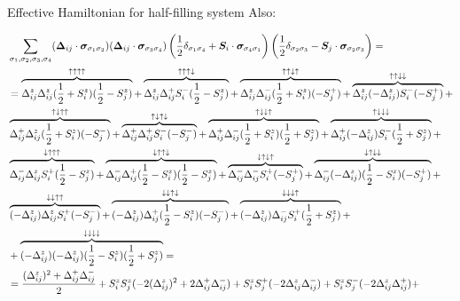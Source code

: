 \begin{section}{Effective Hamiltonian for half-filling system}
Also:

\begin{align*}
&\sum_{\sigma_1, \sigma_2, \sigma_3, \sigma_4} (\bs{\Delta}_{ij}\cdot\bs{\sigma}_{\sigma_1 \sigma_2})(\bs{\Delta}_{ij} \cdot\bs{\sigma}_{\sigma_3 \sigma_4})\left(\frac{1}{2}\delta_{\sigma_1 \sigma_4} + \bs{S}_i\cdot\bs{\sigma}_{\sigma_4 \sigma_1}\right)\left(\frac{1}{2}\delta_{\sigma_2 \sigma_3}-\bs{S}_j\cdot\bs{\sigma}_{\sigma_2 \sigma_3}\right) = \\
&= \overbrace{\Delta_{ij}^z\Delta_{ij}^z(\frac{1}{2}+S_i^z)(\frac{1}{2}-S_j^z)}^{\uparrow \uparrow \uparrow \uparrow} +
	\overbrace{\Delta_{ij}^z\Delta_{ij}^+S_i^-(\frac{1}{2}-S_j^z)}^{\uparrow \uparrow \uparrow \downarrow} +
	\overbrace{\Delta_{ij}^z\Delta_{ij}^-(\frac{1}{2}+ S_i^z)(-S_j^+)}^{\uparrow \uparrow \downarrow \uparrow} +
	\overbrace{\Delta_{ij}^z(-\Delta_{ij}^z) S_i^-(-S_j^+)}^{\uparrow \uparrow \downarrow \downarrow} + \\
	&\overbrace{\Delta_{ij}^+\Delta_{ij}^z (\frac{1}{2}+S_i^z)(-S_j^-)}^{\uparrow \downarrow \uparrow \uparrow} +
	\overbrace{\Delta_{ij}^+\Delta_{ij}^+S_i^-(-S_j^-)}^{\uparrow \downarrow \uparrow \downarrow} +
	\overbrace{\Delta_{ij}^+\Delta_{ij}^-(\frac{1}{2}+S_i^z)(\frac{1}{2}+S_j^z)}^{\uparrow \downarrow \downarrow \uparrow} +
	\overbrace{\Delta_{ij}^+(-\Delta_{ij}^z) S_i^-(\frac{1}{2}+S_j^z)}^{\uparrow \downarrow \downarrow \downarrow} + \\
	&\overbrace{\Delta_{ij}^-\Delta_{ij}^z S_i^+(\frac{1}{2}-S_j^z)}^{\downarrow \uparrow \uparrow \uparrow} +
	\overbrace{\Delta_{ij}^-\Delta_{ij}^+(\frac{1}{2}-S_i^z)(\frac{1}{2}-S_j^z)}^{\downarrow \uparrow \uparrow \downarrow} +
	\overbrace{\Delta_{ij}^-\Delta_{ij}^-S_i^+(-S_j^+)}^{\downarrow \uparrow \downarrow \uparrow} +
	\overbrace{\Delta_{ij}^-(-\Delta_{ij}^z) (\frac{1}{2} - S_i^z) (-S_j^+)}^{\downarrow \uparrow \downarrow \downarrow} + \\
	& \overbrace{(-\Delta_{ij}^z)\Delta_{ij}^z S_i^+(-S_j^-)}^{\downarrow \downarrow \uparrow \uparrow} +
	\overbrace{(-\Delta_{ij}^z)\Delta_{ij}^+ (\frac{1}{2}-S_i^z)(-S_j^-)}^{\downarrow \downarrow \uparrow \downarrow} +
	\overbrace{(-\Delta_{ij}^z)\Delta_{ij}^- S_i^+(\frac{1}{2}+S_j^z)}^{\downarrow \downarrow \downarrow \uparrow} + \\
	&+\overbrace{(-\Delta_{ij}^z)(-\Delta_{ij}^z)(\frac{1}{2}-S_i^z)(\frac{1}{2}+S_j^z)}^{\downarrow \downarrow \downarrow \downarrow} = \\
&= \frac{(\Delta_{ij}^z)^2+\Delta_{ij}^+\Delta_{ij}^-}{2} + S_i^zS_j^z (-2(\Delta_{ij}^z)^2 + 2\Delta_{ij}^+\Delta_{ij}^-) + S_i^zS_j^+(-2\Delta_{ij}^z\Delta_{ij}^-) + S_i^zS_j^-(-2\Delta_{ij}^z\Delta_{ij}^+) +\\ 

\end{align*}
\end{section}
